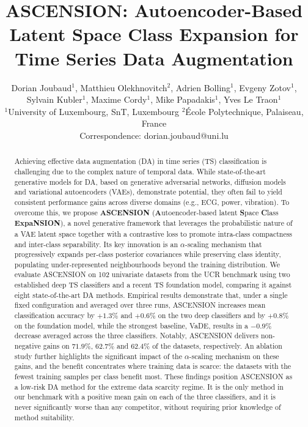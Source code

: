 \documentclass[10pt]{article}
\title{ASCENSION: Autoencoder-Based Latent Space Class Expansion for Time Series Data Augmentation}
\author{Dorian Joubaud$^{1}$, Matthieu Olekhnovitch$^{2}$, Adrien Bolling$^{1}$,
      Evgeny Zotov$^{1}$, Sylvain Kubler$^{1}$, Maxime Cordy$^{1}$,
      Mike Papadakis$^{1}$, Yves Le Traon$^{1}$ \\
      \addr $^{1}$University of Luxembourg, SnT, Luxembourg \quad
      $^{2}$\'Ecole Polytechnique, Palaiseau, France \\
      Correspondence: dorian.joubaud@uni.lu}
\theoremstyle{definition}
\theoremstyle{plain}
\begin{document}
\raggedbottom
\maketitle

\begin{abstract}
Achieving effective data augmentation (DA) in time series (TS)
classification is challenging due to the complex nature of
temporal data. While state-of-the-art generative models for DA,
based on generative adversarial networks, diffusion models and variational autoencoders (VAEs), demonstrate potential,
they often fail to yield consistent performance gains across
diverse domains (e.g., ECG, power, vibration). To overcome this,
we propose \textbf{ASCENSION} (\textbf{A}utoencoder-based latent
\textbf{S}pace \textbf{C}lass \textbf{ExpaNSION}), a novel
generative framework that leverages the probabilistic nature of a
VAE latent space together with a contrastive loss to promote
intra-class compactness and inter-class separability. Its key
innovation is an $\alpha$-scaling mechanism that progressively
expands per-class posterior covariances while preserving class
identity, populating under-represented neighbourhoods beyond the
training distribution. We evaluate ASCENSION on 102 univariate datasets
from the UCR benchmark using two established deep TS
classifiers and a recent TS foundation model, comparing
it against eight state-of-the-art DA methods. Empirical results
demonstrate that, under a single fixed configuration and
averaged over three runs, ASCENSION increases mean
classification accuracy by $+1.3\%$ and $+0.6\%$ on the two deep
classifiers and by $+0.8\%$ on the foundation model, while the
strongest baseline, VaDE, results
in a $-0.9\%$ decrease averaged across the three classifiers. Notably, ASCENSION delivers non-negative
gains on $71.9\%$, $62.7\%$ and $62.4\%$ of the datasets,
respectively. An ablation study
further highlights the significant impact of the $\alpha$-scaling
mechanism on these gains, and the benefit concentrates where
training data is scarce: the datasets with the fewest training
samples per class benefit most. These findings
position ASCENSION as a low-risk DA method for the
extreme data scarcity regime. It is the only method in our benchmark
with a positive mean gain on each of the three classifiers, and it
is never significantly worse than any competitor, without
requiring prior knowledge of
method suitability.
\end{abstract}



















\newpage
\appendix

\end{document}
